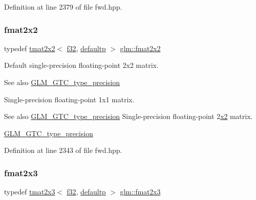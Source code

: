 Definition at line 2379 of file fwd.\+hpp.

\mbox{\label{group__gtc__type__precision_ga20fdbcc6b16bed27ad25db9b71d09e93}} 
\subsubsection{\texorpdfstring{fmat2x2}{fmat2x2}}
{\footnotesize\ttfamily typedef \mbox{\hyperlink{structglm_1_1tmat2x2}{tmat2x2}}$<$ \mbox{\hyperlink{group__gtc__type__precision_ga0ec999b57f5330d9021256e96038df04}{f32}}, \mbox{\hyperlink{namespaceglm_a0f04f086094c747d227af4425893f545a9d21ccd8b5a009ec7eb7677befc3bf51}{defaultp}} $>$ \mbox{\hyperlink{group__gtc__type__precision_ga20fdbcc6b16bed27ad25db9b71d09e93}{glm\+::fmat2x2}}}

Default single-\/precision floating-\/point 2x2 matrix. \begin{DoxySeeAlso}{See also}
\mbox{\hyperlink{group__gtc__type__precision}{G\+L\+M\+\_\+\+G\+T\+C\+\_\+type\+\_\+precision}}
\end{DoxySeeAlso}
Single-\/precision floating-\/point 1x1 matrix. \begin{DoxySeeAlso}{See also}
\mbox{\hyperlink{group__gtc__type__precision}{G\+L\+M\+\_\+\+G\+T\+C\+\_\+type\+\_\+precision}} Single-\/precision floating-\/point 2\mbox{\hyperlink{glad_8h_ad2cea6eadb01f017f0d57e7edf0ce988}{x2}} matrix. 

\mbox{\hyperlink{group__gtc__type__precision}{G\+L\+M\+\_\+\+G\+T\+C\+\_\+type\+\_\+precision}} 
\end{DoxySeeAlso}


Definition at line 2343 of file fwd.\+hpp.

\mbox{\label{group__gtc__type__precision_ga80f463bcb7e5008c11af5fdbc52c0045}} 
\subsubsection{\texorpdfstring{fmat2x3}{fmat2x3}}
{\footnotesize\ttfamily typedef \mbox{\hyperlink{structglm_1_1tmat2x3}{tmat2x3}}$<$ \mbox{\hyperlink{group__gtc__type__precision_ga0ec999b57f5330d9021256e96038df04}{f32}}, \mbox{\hyperlink{namespaceglm_a0f04f086094c747d227af4425893f545a9d21ccd8b5a009ec7eb7677befc3bf51}{defaultp}} $>$ \mbox{\hyperlink{group__gtc__type__precision_ga80f463bcb7e5008c11af5fdbc52c0045}{glm\+::fmat2x3}}}

